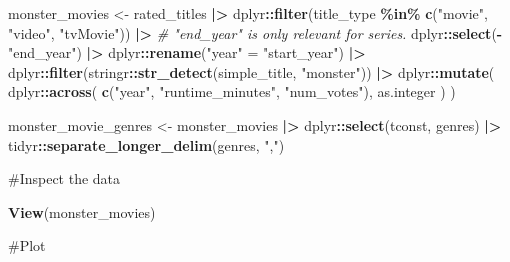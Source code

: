 \documentclass[
]{article}
\newenvironment{Shaded}{\begin{snugshade}}{\end{snugshade}}
\newcommand{\CommentTok}[1]{\textcolor[rgb]{0.56,0.35,0.01}{\textit{#1}}}
\newcommand{\FunctionTok}[1]{\textcolor[rgb]{0.13,0.29,0.53}{\textbf{#1}}}
\newcommand{\NormalTok}[1]{#1}
\newcommand{\OtherTok}[1]{\textcolor[rgb]{0.56,0.35,0.01}{#1}}
\newcommand{\SpecialCharTok}[1]{\textcolor[rgb]{0.81,0.36,0.00}{\textbf{#1}}}
\newcommand{\StringTok}[1]{\textcolor[rgb]{0.31,0.60,0.02}{#1}}
\begin{document}
\begin{Shaded}
\begin{Highlighting}[]
\NormalTok{monster\_movies }\OtherTok{\textless{}{-}}\NormalTok{ rated\_titles }\SpecialCharTok{|\textgreater{}} 
\NormalTok{  dplyr}\SpecialCharTok{::}\FunctionTok{filter}\NormalTok{(title\_type }\SpecialCharTok{\%in\%} \FunctionTok{c}\NormalTok{(}\StringTok{"movie"}\NormalTok{, }\StringTok{"video"}\NormalTok{, }\StringTok{"tvMovie"}\NormalTok{)) }\SpecialCharTok{|\textgreater{}} 
  \CommentTok{\# "end\_year" is only relevant for series.}
\NormalTok{  dplyr}\SpecialCharTok{::}\FunctionTok{select}\NormalTok{(}\SpecialCharTok{{-}}\StringTok{"end\_year"}\NormalTok{) }\SpecialCharTok{|\textgreater{}}
\NormalTok{  dplyr}\SpecialCharTok{::}\FunctionTok{rename}\NormalTok{(}\StringTok{"year"} \OtherTok{=} \StringTok{"start\_year"}\NormalTok{) }\SpecialCharTok{|\textgreater{}} 
\NormalTok{  dplyr}\SpecialCharTok{::}\FunctionTok{filter}\NormalTok{(stringr}\SpecialCharTok{::}\FunctionTok{str\_detect}\NormalTok{(simple\_title, }\StringTok{"monster"}\NormalTok{)) }\SpecialCharTok{|\textgreater{}} 
\NormalTok{  dplyr}\SpecialCharTok{::}\FunctionTok{mutate}\NormalTok{(}
\NormalTok{    dplyr}\SpecialCharTok{::}\FunctionTok{across}\NormalTok{(}
      \FunctionTok{c}\NormalTok{(}\StringTok{"year"}\NormalTok{, }\StringTok{"runtime\_minutes"}\NormalTok{, }\StringTok{"num\_votes"}\NormalTok{),}
\NormalTok{      as.integer}
\NormalTok{    )}
\NormalTok{  )}

\NormalTok{monster\_movie\_genres }\OtherTok{\textless{}{-}}\NormalTok{ monster\_movies }\SpecialCharTok{|\textgreater{}} 
\NormalTok{  dplyr}\SpecialCharTok{::}\FunctionTok{select}\NormalTok{(tconst, genres) }\SpecialCharTok{|\textgreater{}} 
\NormalTok{  tidyr}\SpecialCharTok{::}\FunctionTok{separate\_longer\_delim}\NormalTok{(genres, }\StringTok{","}\NormalTok{)}
\end{Highlighting}
\end{Shaded}

\#Inspect the data

\begin{Shaded}
\begin{Highlighting}[]
\FunctionTok{View}\NormalTok{(monster\_movies)}
\end{Highlighting}
\end{Shaded}

\#Plot
\end{document}
